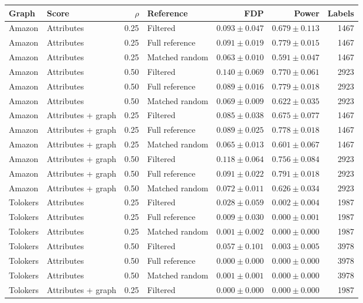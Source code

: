 \begin{tabular}{llrlrrr}
\toprule
Graph & Score & $\rho$ & Reference & FDP & Power & Labels \\
\midrule
Amazon & Attributes & 0.25 & Filtered & $0.093\pm0.047$ & $0.679\pm0.113$ & 1467 \\
Amazon & Attributes & 0.25 & Full reference & $0.091\pm0.019$ & $0.779\pm0.015$ & 1467 \\
Amazon & Attributes & 0.25 & Matched random & $0.063\pm0.010$ & $0.591\pm0.047$ & 1467 \\
Amazon & Attributes & 0.50 & Filtered & $0.140\pm0.069$ & $0.770\pm0.061$ & 2923 \\
Amazon & Attributes & 0.50 & Full reference & $0.089\pm0.016$ & $0.779\pm0.018$ & 2923 \\
Amazon & Attributes & 0.50 & Matched random & $0.069\pm0.009$ & $0.622\pm0.035$ & 2923 \\
Amazon & Attributes + graph & 0.25 & Filtered & $0.085\pm0.038$ & $0.675\pm0.077$ & 1467 \\
Amazon & Attributes + graph & 0.25 & Full reference & $0.089\pm0.025$ & $0.778\pm0.018$ & 1467 \\
Amazon & Attributes + graph & 0.25 & Matched random & $0.065\pm0.013$ & $0.601\pm0.067$ & 1467 \\
Amazon & Attributes + graph & 0.50 & Filtered & $0.118\pm0.064$ & $0.756\pm0.084$ & 2923 \\
Amazon & Attributes + graph & 0.50 & Full reference & $0.091\pm0.022$ & $0.791\pm0.018$ & 2923 \\
Amazon & Attributes + graph & 0.50 & Matched random & $0.072\pm0.011$ & $0.626\pm0.034$ & 2923 \\
Tolokers & Attributes & 0.25 & Filtered & $0.028\pm0.059$ & $0.002\pm0.004$ & 1987 \\
Tolokers & Attributes & 0.25 & Full reference & $0.009\pm0.030$ & $0.000\pm0.001$ & 1987 \\
Tolokers & Attributes & 0.25 & Matched random & $0.001\pm0.002$ & $0.000\pm0.000$ & 1987 \\
Tolokers & Attributes & 0.50 & Filtered & $0.057\pm0.101$ & $0.003\pm0.005$ & 3978 \\
Tolokers & Attributes & 0.50 & Full reference & $0.000\pm0.000$ & $0.000\pm0.000$ & 3978 \\
Tolokers & Attributes & 0.50 & Matched random & $0.001\pm0.001$ & $0.000\pm0.000$ & 3978 \\
Tolokers & Attributes + graph & 0.25 & Filtered & $0.000\pm0.000$ & $0.000\pm0.000$ & 1987 \\

\end{tabular}
